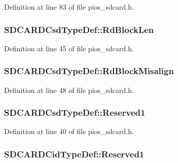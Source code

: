 Definition at line 83 of file pios\-\_\-sdcard.\-h.

\hypertarget{group___p_i_o_s___s_d_c_a_r_d_gab4a98c4b27e0e4cbb4ace4d6ff93c056}{
\subsubsection[{Rd\-Block\-Len}]{ S\-D\-C\-A\-R\-D\-Csd\-Type\-Def\-::\-Rd\-Block\-Len}}\label{group___p_i_o_s___s_d_c_a_r_d_gab4a98c4b27e0e4cbb4ace4d6ff93c056}


Definition at line 45 of file pios\-\_\-sdcard.\-h.

\hypertarget{group___p_i_o_s___s_d_c_a_r_d_ga959156fe53645cd48d715f89c3407618}{
\subsubsection[{Rd\-Block\-Misalign}]{ S\-D\-C\-A\-R\-D\-Csd\-Type\-Def\-::\-Rd\-Block\-Misalign}}\label{group___p_i_o_s___s_d_c_a_r_d_ga959156fe53645cd48d715f89c3407618}


Definition at line 48 of file pios\-\_\-sdcard.\-h.

\hypertarget{group___p_i_o_s___s_d_c_a_r_d_ga8d15c8c3b9e293b1b62efea47010180d}{
\subsubsection[{Reserved1}]{ S\-D\-C\-A\-R\-D\-Csd\-Type\-Def\-::\-Reserved1}}\label{group___p_i_o_s___s_d_c_a_r_d_ga8d15c8c3b9e293b1b62efea47010180d}


Definition at line 40 of file pios\-\_\-sdcard.\-h.

\hypertarget{group___p_i_o_s___s_d_c_a_r_d_gaa6d5ceee00ac588d04a7d1e913746732}{
\subsubsection[{Reserved1}]{ S\-D\-C\-A\-R\-D\-Cid\-Type\-Def\-::\-Reserved1}}\label{group___p_i_o_s___s_d_c_a_r_d_gaa6d5ceee00ac588d04a7d1e913746732}


